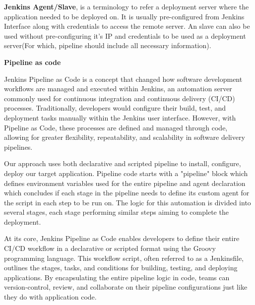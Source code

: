 \documentclass[12pt,a4paper,oneside]{report}
\begin{document}
\par\hspace{1cm}\textbf{Jenkins Agent/Slave}, is a terminology to refer a deployment server where the application needed to be deployed on. It is usually pre-configured from Jenkins Interface along with credentials to access the remote server. An slave can also be used without pre-configuring it's IP and credentials to be used as a deployment server(For which, pipeline should include all necessary information).


\hspace{1cm}\textbf{{\large Pipeline as code}}
\par\hspace{1cm}Jenkins Pipeline as Code is a concept that changed how software development workflows are managed and executed within Jenkins, an automation server commonly used for continuous integration and continuous delivery (CI/CD) processes. Traditionally, developers would configure their build, test, and deployment tasks manually within the Jenkins user interface. However, with Pipeline as Code, these processes are defined and managed through code, allowing for greater flexibility, repeatability, and scalability in software delivery pipelines.

\par\hspace{1cm} Our approach uses both declarative and scripted pipeline to install, configure, deploy our target application. Pipeline code starts with a "pipeline" block which defines environment variables used for the entire pipeline and agent declaration which concludes if each stage in the pipeline needs to define its custom agent for the script in each step to be run on. The logic for this automation is divided into several stages, each stage performing similar steps aiming to complete the deployment.

\par\hspace{1cm}At its core, Jenkins Pipeline as Code enables developers to define their entire CI/CD workflow in a declarative or scripted format using the Groovy programming language. This workflow script, often referred to as a Jenkinsfile, outlines the stages, tasks, and conditions for building, testing, and deploying applications. By encapsulating the entire pipeline logic in code, teams can version-control, review, and collaborate on their pipeline configurations just like they do with application code.
\end{document}
